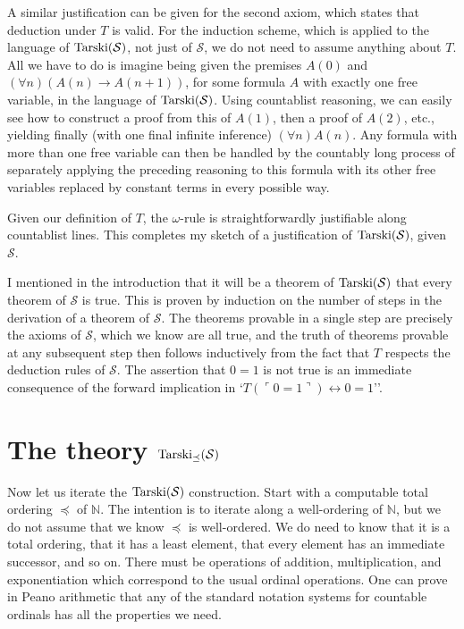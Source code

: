 \documentclass{amsart}
\begin{document}
A similar justification can be given for the second axiom, which states that deduction under $T$ is valid.
For the induction scheme, which is applied to the language of ${\rm Tarski}(\mathcal{S})$, not just
of $\mathcal{S}$, we do not need to assume anything about $T$. All we have to do is imagine
being given the premises $A(0)$ and $(\forall n)(A(n) \to A(n+1))$, for some formula $A$ with
exactly one free variable, in the language of ${\rm Tarski}(\mathcal{S})$. Using countablist
reasoning, we can easily see how to construct a proof from this of $A(1)$, then a proof of $A(2)$,
etc., yielding finally (with one final infinite inference) $(\forall n)A(n)$. Any formula with more than one
free variable can then be handled by the countably long process of separately applying the preceding
reasoning to this formula with its other free variables replaced by constant terms in every possible
way.

Given our definition of $T$, the $\omega$-rule is straightforwardly justifiable along countablist lines.
This completes my sketch of a justification of ${\rm Tarski}(\mathcal{S})$, given $\mathcal{S}$.

I mentioned in the introduction that it will be a theorem of ${\rm Tarski}(\mathcal{S})$ that every
theorem of $\mathcal{S}$ is true. This is proven by induction on the number of steps in the derivation
of a theorem of $\mathcal{S}$. The theorems provable in a single step are precisely the axioms of
$\mathcal{S}$, which we know are all true, and the truth of theorems provable at any subsequent step
then follows inductively from the fact that $T$ respects the deduction rules of $\mathcal{S}$. The
assertion that $0 = 1$ is not true is an immediate consequence of the forward
implication in `$T(\ulcorner 0 = 1\urcorner) \leftrightarrow 0=1$''.

\section{The theory ${\rm Tarski}_{\preceq}(\mathcal{S})$}

Now let us iterate the ${\rm Tarski}(\mathcal{S})$ construction. Start with a computable total ordering
$\preceq$ of $\mathbb{N}$. The intention is to iterate along a well-ordering of $\mathbb{N}$, but we do not
assume that we know $\preceq$ is well-ordered. We do need to know that it is a total ordering,
that it has a least element, that every element has an immediate successor, and so on. There must be
operations of addition, multiplication, and exponentiation which correspond to the usual ordinal operations.
One can prove in Peano arithmetic that any of the standard notation systems for countable ordinals has
all the properties we need.
\end{document}
